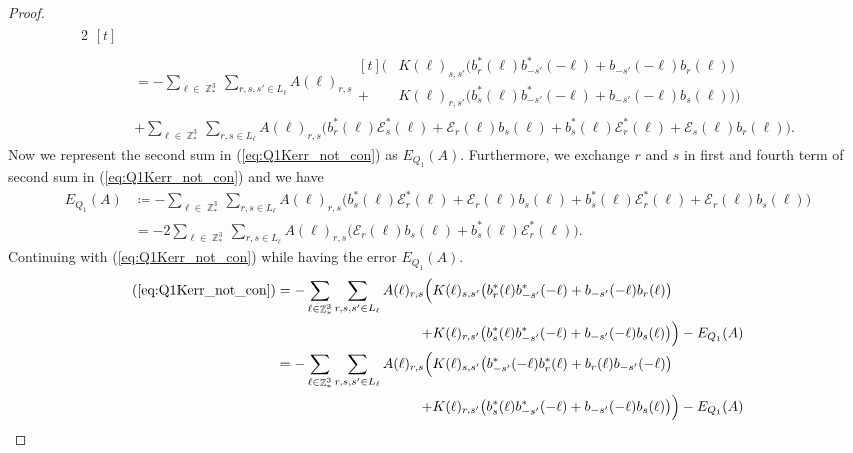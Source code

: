 \documentclass[sn-mathphys, Numbered ,a4paper]{sn-jnl}%
\DeclareMathOperator{\Z}{\mathbb{Z}}
\theoremstyle{plain}
\theoremstyle{definition}
\theoremstyle{remark}
\theoremstyle{plain}
\theoremstyle{definition}
\theoremstyle{remark}
\begin{document}
\begin{proof}
\begin{alignat}{2}
\begin{aligned}[t]
    \end{aligned}\nonumber\\
    &=-\sum\limits_{\ell \in \Z^3_*}\sum\limits_{r,s,s' \in L_{\ell}}A(\ell)_{r,s}\begin{aligned}[t]
        \Big(&K(\ell)_{s,s'}\big(b^*_{r}(\ell)b^*_{-s'}(-\ell)+b_{-s'}(-\ell)b_{r}(\ell)\big)\\ + &K(\ell)_{r,s'}\big(b^*_{s}(\ell)b^*_{-s'}(-\ell) +b_{-s'}(-\ell)b_{s}(\ell) \big)\Big) 
    \end{aligned}\nonumber\\
    &+\sum\limits_{\ell \in \Z^3_*}\sum\limits_{r,s \in L_{\ell}}A(\ell)_{r,s}\Big(b^*_{r}(\ell)\mathcal{E}^*_{s}(\ell) + \mathcal{E}_{r}(\ell)b_{s}(\ell) + b^*_{s}(\ell)\mathcal{E}^*_{r}(\ell) + \mathcal{E}_{s}(\ell)b_{r}(\ell)\Big).\label{eq:Q1Kerr_not_con}
\end{alignat}
Now we represent the second sum in (\ref{eq:Q1Kerr_not_con}) as $E_{Q_1}(A)$. Furthermore, we exchange $r$ and $s$ in first and fourth term of second sum in (\ref{eq:Q1Kerr_not_con}) and we have
\begin{align}
    E_{Q_1}(A)&\coloneq -\sum\limits_{\ell \in \Z^3_*}\sum\limits_{r,s \in L_{\ell}}A(\ell)_{r,s}\Big(b^*_{s}(\ell)\mathcal{E}^*_{r}(\ell) + \mathcal{E}_{r}(\ell)b_{s}(\ell) + b^*_{s}(\ell)\mathcal{E}^*_{r}(\ell) + \mathcal{E}_{r}(\ell)b_{s}(\ell)\Big)\nonumber\\
    &= - 2 \sum\limits_{\ell \in \Z^3_*}\sum\limits_{r,s \in L_{\ell}}A(\ell)_{r,s}\Big(\mathcal{E}_{r}(\ell)b_{s}(\ell) + b^*_{s}(\ell)\mathcal{E}^*_{r}(\ell)\Big).
\end{align}
Continuing with (\ref{eq:Q1Kerr_not_con}) while having the error $E_{Q_1}(A)$.
\begin{align}
    (\ref{eq:Q1Kerr_not_con}) = -\sum\limits_{\ell \in \Z^3_*}\sum\limits_{r,s,s' \in L_{\ell}}A(\ell)_{r,s}
    \Big(&K(\ell)_{s,s'}\big(b^*_{r}(\ell)b^*_{-s'}(-\ell)+b_{-s'}(-\ell)b_{r}(\ell)\big)\nonumber\\ + &K(\ell)_{r,s'}\big(b^*_{s}(\ell)b^*_{-s'}(-\ell) +b_{-s'}(-\ell)b_{s}(\ell) \big)\Big) - E_{Q_1}(A)\nonumber\\
    =-\sum\limits_{\ell \in \Z^3_*}\sum\limits_{r,s,s' \in L_{\ell}}A(\ell)_{r,s}
    \Big(&K(\ell)_{s,s'}\big(b^*_{-s'}(-\ell)b^*_{r}(\ell)+b_{r}(\ell)b_{-s'}(-\ell)\big)\nonumber\\ + &K(\ell)_{r,s'}\big(b^*_{s}(\ell)b^*_{-s'}(-\ell) +b_{-s'}(-\ell)b_{s}(\ell) \big)\Big) - E_{Q_1}(A)\label{eq:Q1Knoiden}
\end{align}


\end{proof}
\end{document}
